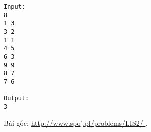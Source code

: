 \begin{verbatim}
Input:
8
1 3
3 2
1 1
4 5
6 3
9 9
8 7
7 6

Output:
3
\end{verbatim}

   Bài gốc:   \href{http://www.spoj.pl/problems/LIS2/}{    http://www.spoj.pl/problems/LIS2/   }   .